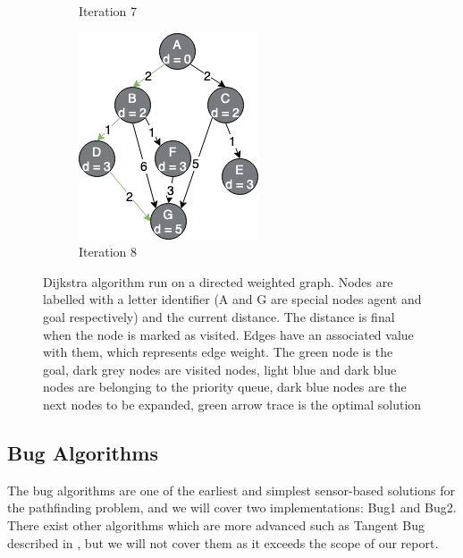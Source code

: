 \begin{figure}[h!]
\begin{subfigure}[b]{0.2\linewidth}
     \caption{Iteration 7}
  \end{subfigure}
  \hfill
  \begin{subfigure}[b]{0.2\linewidth}
    \includegraphics[width=\linewidth]{images/dijkstra_expansion8.png}
    \caption{Iteration 8}
  \end{subfigure}
  \hfill
  \caption{Dijkstra algorithm run on a directed weighted graph. Nodes are labelled with a letter identifier (A and G are special nodes agent and goal respectively) and the current distance. The distance is final when the node is marked as visited. Edges have an associated value with them, which represents edge weight. The green node is the goal, dark grey nodes are visited nodes, light blue and dark blue nodes are belonging to the priority queue, dark blue nodes are the next nodes to be expanded, green arrow trace is the optimal solution}
  \label{fig:dijkstra_expansion}
\end{figure}

\pagebreak

\subsection{Bug Algorithms}
The bug algorithms \cite{choset2005principles, rajko2001pursuit} are one of the earliest and simplest sensor-based solutions for the pathfinding problem, and we will cover two implementations: Bug1 and Bug2. There exist other algorithms which are more advanced such as Tangent Bug described in \cite{choset2005principles, rajko2001pursuit, kamon1998tangentbug}, but we will not cover them as it exceeds the scope of our report.

